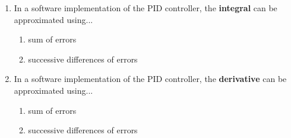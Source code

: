 \documentclass[a4paper,10pt,reqno]{amsart}
\numberwithin{equation}{section}
\theoremstyle{plain}
\begin{document}
\begin{enumerate}
  \item In a software implementation of the PID controller, the \textbf{integral} 
         can be approximated using...
  \begin{enumerate}
   \item sum of errors
   \item successive differences of errors
  \end{enumerate}
        
  \item In a software implementation of the PID controller, the \textbf{derivative} 
         can be approximated using...
  \begin{enumerate}
   \item sum of errors
   \item successive differences of errors
  \end{enumerate}      
\end{enumerate}
\end{document}
